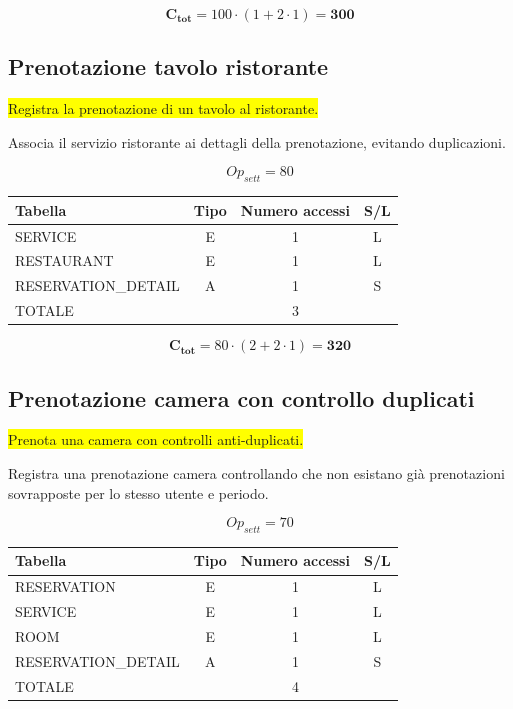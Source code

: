 \documentclass[a4paper,12pt]{report}
\begin{document}
$$\mathbf{C_{tot}} = 100 \cdot (1 + 2 \cdot 1) = \mathbf{300}$$

\subsection*{Prenotazione tavolo ristorante} \label{op14}
\colorbox{yellow}{Registra la prenotazione di un tavolo al ristorante.}

Associa il servizio ristorante ai dettagli della prenotazione,
evitando duplicazioni.

$$Op_{sett} = 80$$

\begin{table}[H]
  \centering
  \small
  \renewcommand{\arraystretch}{1.15}
  \begin{tabularx}{0.8\textwidth}{|X|c|c|c|}
    \hline
    \rowcolor{gray!20}
    \textbf{Tabella} & \textbf{Tipo} & \textbf{Numero accessi} & \textbf{S/L} \\
    \hline
    SERVICE & E & 1 & L \\
    RESTAURANT & E & 1 & L \\
    RESERVATION\_DETAIL & A & 1 & S \\
    \hline
    \rowcolor{gray!20}
    TOTALE & & 3 & \\
    \hline
  \end{tabularx}
  \vspace{-1em}
\end{table}

$$\mathbf{C_{tot}} = 80 \cdot (2 + 2 \cdot 1) = \mathbf{320}$$

\subsection*{Prenotazione camera con controllo duplicati} \label{op15}
\colorbox{yellow}{Prenota una camera con controlli anti-duplicati.}

Registra una prenotazione camera controllando che non esistano già
prenotazioni sovrapposte per lo stesso utente e periodo.

$$Op_{sett} = 70$$

\begin{table}[H]
  \centering
  \small
  \renewcommand{\arraystretch}{1.15}
  \begin{tabularx}{0.8\textwidth}{|X|c|c|c|}
    \hline
    \rowcolor{gray!20}
    \textbf{Tabella} & \textbf{Tipo} & \textbf{Numero accessi} & \textbf{S/L} \\
    \hline
    RESERVATION & E & 1 & L \\
    SERVICE & E & 1 & L \\
    ROOM & E & 1 & L \\
    RESERVATION\_DETAIL & A & 1 & S \\
    \hline
    \rowcolor{gray!20}
    TOTALE & & 4 & \\
    \hline
  \end{tabularx}
  \vspace{-1em}
\end{table}
\end{document}
